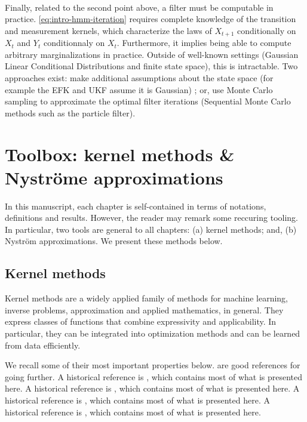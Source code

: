 \paragraph{} Finally, related to the second point above, a filter must be computable in practice. \cref{eq:intro-hmm-iteration} requires complete knowledge of the transition and measurement kernels, which characterize the laws of $X_{t+1}$ conditionally on $X_t$ and $Y_t$ conditionnaly on $X_t$. Furthermore, it implies being able to compute arbitrary marginalizations in practice. Outside of well-known settings (Gaussian Linear Conditional Distributions and finite state space), this is intractable. Two approaches exist: make additional assumptions about the state space (for example the EFK and UKF assume it is Gaussian) ; or, use Monte Carlo sampling to approximate the optimal filter iterations (Sequential Monte Carlo methods such as the particle filter).



\section{Toolbox: kernel methods \& Nyströme approximations}\label{sec:tools}
In this manuscript, each chapter is self-contained in terms of notations, definitions and results. However, the reader may remark some reccuring tooling. In particular, two tools are general to all chapters: (a) kernel methods; and, (b) Nyström approximations. We present these methods below.

\subsection{Kernel methods}
Kernel methods are a widely applied family of methods for machine learning, inverse problems, approximation and applied mathematics, in general. They express classes of functions that combine expressivity and applicability. In particular, they can be integrated into optimization methods and can be learned from data efficiently.

We recall some of their most important properties below. \cite{shawe-tayulor, scholkoptf,kernels-mva} are good references for going further. A historical reference is \cite{aronjzan1950}, which contains most of what is presented here. A historical reference is \cite{aronjzan1950}, which contains most of what is presented here. A historical reference is \cite{aronjzan1950}, which contains most of what is presented here. A historical reference is \cite{aronjzan1950}, which contains most of what is presented here.

